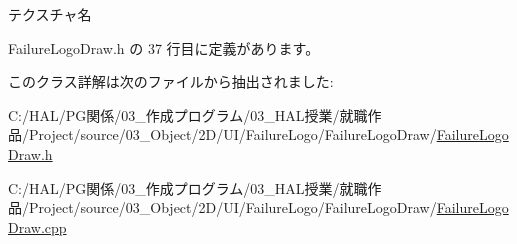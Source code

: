 テクスチャ名 



 Failure\+Logo\+Draw.\+h の 37 行目に定義があります。



このクラス詳解は次のファイルから抽出されました\+:\begin{DoxyCompactItemize}
\item 
C\+:/\+H\+A\+L/\+P\+G関係/03\+\_\+作成プログラム/03\+\_\+\+H\+A\+L授業/就職作品/\+Project/source/03\+\_\+\+Object/2\+D/\+U\+I/\+Failure\+Logo/\+Failure\+Logo\+Draw/\mbox{\hyperlink{_failure_logo_draw_8h}{Failure\+Logo\+Draw.\+h}}\item 
C\+:/\+H\+A\+L/\+P\+G関係/03\+\_\+作成プログラム/03\+\_\+\+H\+A\+L授業/就職作品/\+Project/source/03\+\_\+\+Object/2\+D/\+U\+I/\+Failure\+Logo/\+Failure\+Logo\+Draw/\mbox{\hyperlink{_failure_logo_draw_8cpp}{Failure\+Logo\+Draw.\+cpp}}\end{DoxyCompactItemize}
